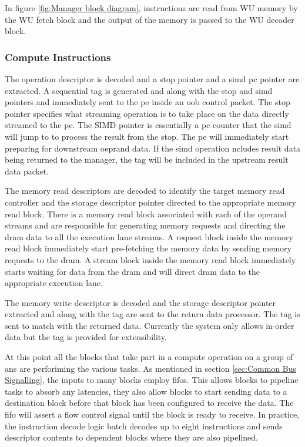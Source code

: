 In figure \ref{fig:Manager block diagram}, instructions are read from WU memory by the WU fetch block and the output of the memory is passed to the WU decoder block.

\subsubsection{Compute Instructions}
\label{sec:Decoding Compute Instructions}

The operation descriptor is decoded and a \ac{stop} pointer and a \ac{simd} \ac{pc} pointer are extracted. 
A sequential tag is generated and along with the \ac{stop} and \ac{simd} pointers and immediately sent to the \ac{pe} inside an \ac{oob} control packet.
The \ac{stop} pointer specifies what streaming operation is to take place on the data directly streamed to the \ac{pe}. 
The SIMD pointer is essentially a \ac{pc} counter that the \ac{simd} will jump to to process the result from the \ac{stop}.
The \ac{pe} will immediately start preparing for downstream oeprand data.
If the \ac{simd} operation ncludes result data being returned to the manager, the tag will be included in the upstream result data packet.

The memory read descriptors are decoded to identify the target memory read controller and the storage descriptor pointer directed to the appropriate memory read block.
There is a memory read block associated with each of the operand streams and are responsible for generating memory requests and directing the \ac{dram} data to all the execution lane streams.
A request block inside the memory read block immediately start pre-fetching the memory data by sending memory requests to the \ac{dram}.
A stream block inside the memory read block immediately starts waiting for data from the \ac{dram} and will direct \ac{dram} data to the appropriate execution lane.

The memory write descriptor is decoded and the storage descriptor pointer extracted and along with the tag are sent to the return data processor. The tag is sent to match with the returned data.
Currently the system only allows in-order data but the tag is provided for extensibility.

At this point all the blocks that take part in a compute operation on a group of \acp{an} are perforiming the various tasks.
As mentioned in section \ref{sec:Common Bus Signalling}, the inputs to many blocks employ \acp{fifo}. 
This allows blocks to pipeline tasks to absorb any latencies, they also allow blocks to start sending data to a destination block before that block has been configured to receive the data.
The \ac{fifo} will assert a flow control signal until the block is ready to receive.
In practice, the instruction decode logic batch decodes up to eight instructions and sends descriptor contents to dependent blocks where they are also pipelined.

